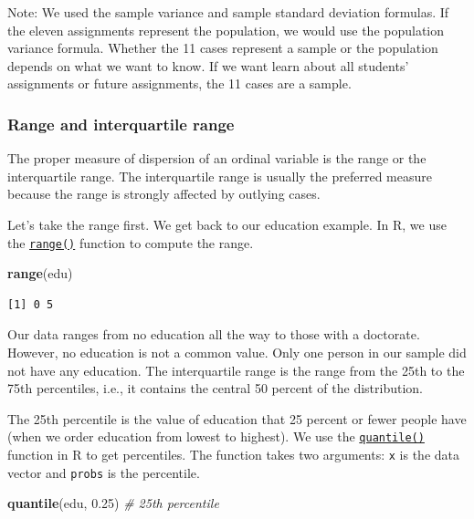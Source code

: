 \documentclass[]{book}
\newenvironment{Shaded}{\begin{snugshade}}{\end{snugshade}}
\newcommand{\KeywordTok}[1]{\textcolor[rgb]{0.13,0.29,0.53}{\textbf{#1}}}
\newcommand{\FloatTok}[1]{\textcolor[rgb]{0.00,0.00,0.81}{#1}}
\newcommand{\CommentTok}[1]{\textcolor[rgb]{0.56,0.35,0.01}{\textit{#1}}}
\newcommand{\NormalTok}[1]{#1}
\theoremstyle{definition}
\theoremstyle{definition}
\theoremstyle{definition}
\theoremstyle{remark}
\begin{document}
Note: We used the sample variance and sample standard deviation
formulas. If the eleven assignments represent the population, we would
use the population variance formula. Whether the 11 cases represent a
sample or the population depends on what we want to know. If we want
learn about all students' assignments or future assignments, the 11
cases are a sample.

\subsubsection{Range and interquartile
range}\label{range-and-interquartile-range}

The proper measure of dispersion of an ordinal variable is the range or
the interquartile range. The interquartile range is usually the
preferred measure because the range is strongly affected by outlying
cases.

Let's take the range first. We get back to our education example. In R,
we use the \href{http://bit.ly/R_range}{\texttt{range()}} function to
compute the range.

\begin{Shaded}
\begin{Highlighting}[]
\KeywordTok{range}\NormalTok{(edu)}
\end{Highlighting}
\end{Shaded}

\begin{verbatim}
[1] 0 5
\end{verbatim}

Our data ranges from no education all the way to those with a doctorate.
However, no education is not a common value. Only one person in our
sample did not have any education. The interquartile range is the range
from the 25th to the 75th percentiles, i.e., it contains the central 50
percent of the distribution.

The 25th percentile is the value of education that 25 percent or fewer
people have (when we order education from lowest to highest). We use the
\href{http://bit.ly/R_quantile}{\texttt{quantile()}} function in R to
get percentiles. The function takes two arguments: \texttt{x} is the
data vector and \texttt{probs} is the percentile.

\begin{Shaded}
\begin{Highlighting}[]
\KeywordTok{quantile}\NormalTok{(edu, }\FloatTok{0.25}\NormalTok{) }\CommentTok{# 25th percentile}
\end{Highlighting}
\end{Shaded}
\end{document}
